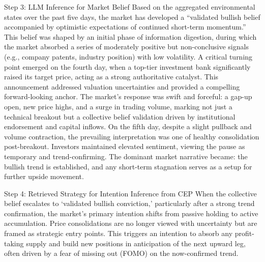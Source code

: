 \documentclass[letterpaper]{article} %
\begin{document}
\begin{forwardMainBox}{Step 3: LLM Inference for Market Belief}
    Based on the aggregated environmental states over the past five days, the market has developed a ``validated bullish belief accompanied by optimistic expectations of continued short-term momentum.'' This belief was shaped by an initial phase of information digestion, during which the market absorbed a series of moderately positive but non-conclusive signals (e.g., company patents, industry position) with low volatility.
    A critical turning point emerged on the fourth day, when a top-tier investment bank significantly raised its target price, acting as a strong authoritative catalyst. This announcement addressed valuation uncertainties and provided a compelling forward-looking anchor. The market's response was swift and forceful: a gap-up open, new price highs, and a surge in trading volume, marking not just a technical breakout but a collective belief validation driven by institutional endorsement and capital inflows.
    On the fifth day, despite a slight pullback and volume contraction, the prevailing interpretation was one of healthy consolidation post-breakout. Investors maintained elevated sentiment, viewing the pause as temporary and trend-confirming. The dominant market narrative became: the bullish trend is established, and any short-term stagnation serves as a setup for further upside movement.
\end{forwardMainBox}

\begin{forwardAuxBox}{Step 4: Retrieved Strategy for Intention Inference from CEP}
    When the collective belief escalates to `validated bullish conviction,' particularly after a strong trend confirmation, the market's primary intention shifts from passive holding to active accumulation. Price consolidations are no longer viewed with uncertainty but are framed as strategic entry points. This triggers an intention to absorb any profit-taking supply and build new positions in anticipation of the next upward leg, often driven by a fear of missing out (FOMO) on the now-confirmed trend.
\end{forwardAuxBox}
\end{document}
